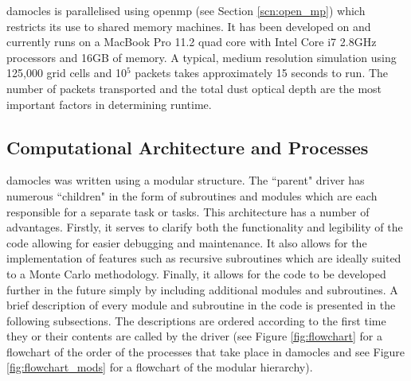         {\sc damocles} is parallelised using {\sc openmp} (see Section \ref{scn:open_mp}) which restricts its use to shared memory machines.  It has been developed on and currently runs on a MacBook Pro 11.2 quad core with Intel Core i7 2.8GHz processors and 16GB of memory.  A typical, medium resolution simulation using 125,000 grid cells and 10$^5$ packets takes approximately 15 seconds to run.  The number of packets transported and the total dust optical depth are the most important factors in determining runtime.  	

        
        \subsection{Computational Architecture and Processes}
        {\sc damocles} was written using a modular structure.  The ``parent" driver has numerous ``children" in the form of subroutines and modules which are each responsible for a separate task or tasks.  This architecture has a number of advantages.  Firstly, it serves to clarify both the functionality and legibility of the code allowing for easier debugging and maintenance.  It also allows for the implementation of features such as recursive subroutines which are ideally suited to a Monte Carlo methodology.  Finally, it allows for the code to be developed further in the future simply by including additional modules and subroutines.  A brief description of every module and subroutine in the code is presented in the following subsections.  The descriptions are ordered according to the first time they or their contents are called by the driver (see Figure \ref{fig:flowchart} for a flowchart of the order of the processes that take place in {\sc damocles} and see Figure \ref{fig:flowchart_mods} for a flowchart of the modular hierarchy).
        


